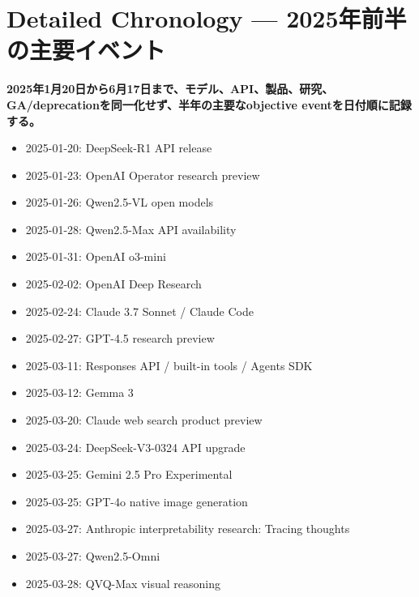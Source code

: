 \section{Detailed Chronology — 2025年前半の主要イベント}
\noindent\textbf{2025年1月20日から6月17日まで、モデル、API、製品、研究、GA/deprecationを同一化せず、半年の主要なobjective eventを日付順に記録する。}\autocite{src-53f15d483a2d,src-8f8555b73e1b}

\begin{itemize}
  \item 2025-01-20: DeepSeek-R1 API release
  \item 2025-01-23: OpenAI Operator research preview
  \item 2025-01-26: Qwen2.5-VL open models
  \item 2025-01-28: Qwen2.5-Max API availability
  \item 2025-01-31: OpenAI o3-mini
\end{itemize}
\autocite{src-650b567698aa,src-8c485019ad8d,src-8f8555b73e1b,src-95b210494c88,src-dc21f366b638}

\begin{itemize}
  \item 2025-02-02: OpenAI Deep Research
  \item 2025-02-24: Claude 3.7 Sonnet / Claude Code
  \item 2025-02-27: GPT-4.5 research preview
\end{itemize}
\autocite{src-3fa7f4cd510b,src-8fec3ef3a97d,src-a6c92f94a0af}

\begin{itemize}
  \item 2025-03-11: Responses API / built-in tools / Agents SDK
  \item 2025-03-12: Gemma 3
  \item 2025-03-20: Claude web search product preview
  \item 2025-03-24: DeepSeek-V3-0324 API upgrade
  \item 2025-03-25: Gemini 2.5 Pro Experimental
  \item 2025-03-25: GPT-4o native image generation
  \item 2025-03-27: Anthropic interpretability research: Tracing thoughts
  \item 2025-03-27: Qwen2.5-Omni
  \item 2025-03-28: QVQ-Max visual reasoning
\end{itemize}
\autocite{src-1bb16d7254b1,src-421ee9af3f80,src-6e15bd50b7db,src-78593f4b387f,src-877e7da88408,src-8cb736b33646,src-8f8555b73e1b,src-de4ffd746276,src-fdc10e3226e6}

